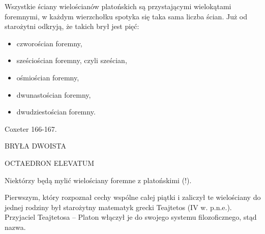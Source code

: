 %

Wszystkie ściany wielościanów platońskich są przystającymi wielokątami foremnymi, w każdym wierzchołku spotyka się taka sama liczba ścian.
Już od starożytni odkryją, że takich brył jest pięć:
\begin{itemize}
\item czworościan foremny,
\item sześciościan foremny, czyli sześcian,
\item ośmiościan foremny,
\item dwunastościan foremny,
\item dwudziestościan foremny.
\end{itemize}

Coxeter 166-167.

BRYŁA DWOISTA

OCTAEDRON ELEVATUM

Niektórzy będą mylić wielościany foremne z platońskimi (!).

Pierwszym, który rozpoznał cechy wspólne całej piątki i zaliczył te wielościany do jednej rodziny był starożytny matematyk grecki Teajtetos (IV w. p.n.e.). 
Przyjaciel Teajtetosa -- Platon włączył je do swojego systemu filozoficznego, stąd nazwa.


%